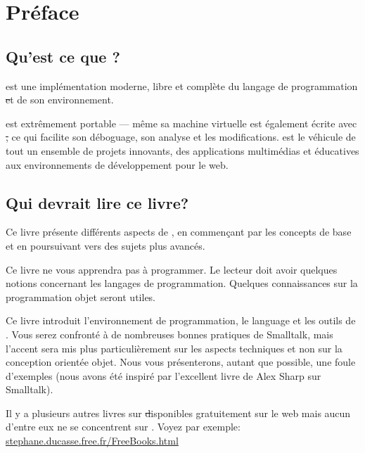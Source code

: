 \documentclass[a4paper,10pt,twoside]{book}
\begin{document}
\fi
\renewcommand{\nnbb}[2]{} %
\sloppy
\chapter{Pr\'eface}\label{cha:intro}

\section*{Qu'est ce que \sq?}

\sq est une impl\'ementation moderne, libre et compl\`ete du langage de programmation \st et de son environnement.

\sq est extr\^emement portable --- m\^eme sa machine virtuelle est \'egalement \'ecrite avec \st, ce qui facilite son d\'eboguage, son analyse et les modifications. \sq est le v\'ehicule de tout un ensemble de projets innovants, des applications multim\'edias et \'educatives aux environnements de d\'eveloppement pour le web.

\section*{Qui devrait lire ce livre?}

Ce livre pr\'esente diff\'erents aspects de \sq, en commen\c{c}ant par les concepts de base et en poursuivant vers des sujets plus avanc\'es.

Ce livre ne vous apprendra pas \`a programmer. Le lecteur doit avoir quelques notions concernant les langages de programmation. Quelques connaissances sur la programmation objet seront utiles.

Ce livre introduit l'environnement de programmation, le language et
les outils de \sq. Vous serez confront\'e \`a de nombreuses bonnes
pratiques de Smalltalk, mais l'accent sera mis plus particuli\`erement
sur les aspects techniques et non sur la conception orient\'ee
objet. Nous vous pr\'esenterons, autant que possible, une foule 
d'exemples (nous avons \'et\'e inspir\'e par l'excellent livre de Alex
Sharp sur Smalltalk\cite{Shar97a}).

Il y a plusieurs autres livres sur \st disponibles gratuitement sur le web mais aucun d'entre eux ne se concentrent sur \sq. Voyez par exemple:
\url{stephane.ducasse.free.fr/FreeBooks.html}
\end{document}

